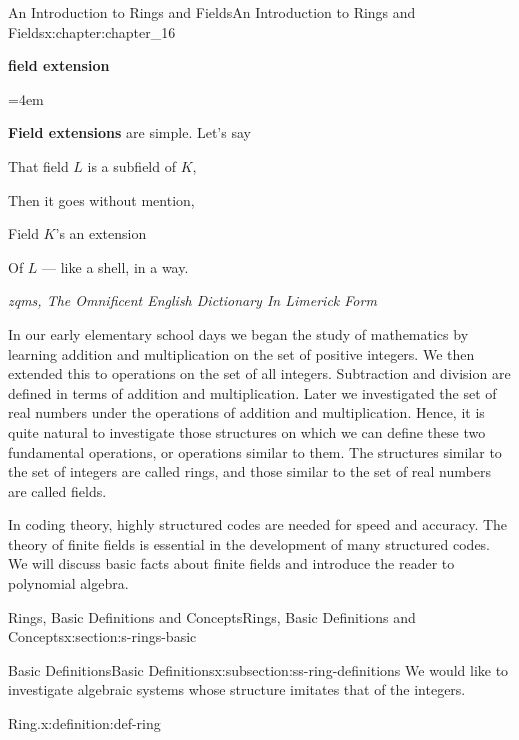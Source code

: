 \documentclass[twoside,10pt,]{book}
\newcommand{\terminology}[1]{\textbf{#1}}
\numberwithin{equation}{section}
\newenvironment{poem}{\setlength{\parindent}{0em}}{}
\newcommand{\poemTitle}[1]{\begin{center}\large\textbf{#1}\end{center}}
\newenvironment{stanza}{\vspace{0.25 em}\hangindent=4em}{\vspace{1 em}}
\newcommand{\poemauthorleft}[1]{\vspace{-1em}\begin{flushleft}\textit{#1}\end{flushleft}}
\newcommand{\poemlineleft}[1]{{\raggedright{#1}\par}\vspace{-\parskip}}
\begin{document}
\begin{chapterptx}{An Introduction to Rings and Fields}{}{An Introduction to Rings and Fields}{}{}{x:chapter:chapter_16}
\begin{introduction}{}%
\begin{poem}%
\poemTitle{field extension}
\begin{stanza}
\poemlineleft{\terminology{Field extensions} are simple. Let's say}
\poemlineleft{That field \(L\) is a subfield of \(K\),}
\poemlineleft{Then it goes without mention,}
\poemlineleft{Field \(K\)'s an extension}
\poemlineleft{Of \(L\) — like a shell, in a way.}
\end{stanza}
\poemauthorleft{zqms, The Omnificent English Dictionary In Limerick Form}
\end{poem}
In our early elementary school days we began the study of mathematics by learning addition and multiplication on the set of positive integers. We then extended this to operations on the set of all integers. Subtraction and division are defined in terms of addition and multiplication. Later we investigated the set of real numbers under the operations of addition and multiplication. Hence, it is quite natural to investigate those structures on which we can define these two fundamental operations, or operations similar to them. The structures similar to the set of integers are called rings, and those similar to the set of real numbers are called fields.%
\par
In coding theory, highly structured codes are needed for speed and accuracy. The theory of finite fields is essential in the development of many structured codes. We will discuss basic facts about finite fields and introduce the reader to polynomial algebra.%
\end{introduction}%
%
%
\typeout{************************************************}
\typeout{************************************************}
%
\begin{sectionptx}{Rings, Basic Definitions and Concepts}{}{Rings, Basic Definitions and Concepts}{}{}{x:section:s-rings-basic}
%
%
\typeout{************************************************}
\typeout{************************************************}
%
\begin{subsectionptx}{Basic Definitions}{}{Basic Definitions}{}{}{x:subsection:ss-ring-definitions}
We would like to investigate algebraic systems whose structure imitates that of the integers.%
\begin{definition}{Ring.}{x:definition:def-ring}%

\end{definition}
\end{subsectionptx}
\end{sectionptx}
\end{chapterptx}
\end{document}
